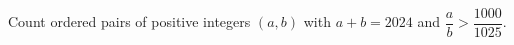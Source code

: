Count ordered pairs of positive integers $(a,b)$ with $a+b=2024$ and $\dfrac{a}{b}>\dfrac{1000}{1025}$.
